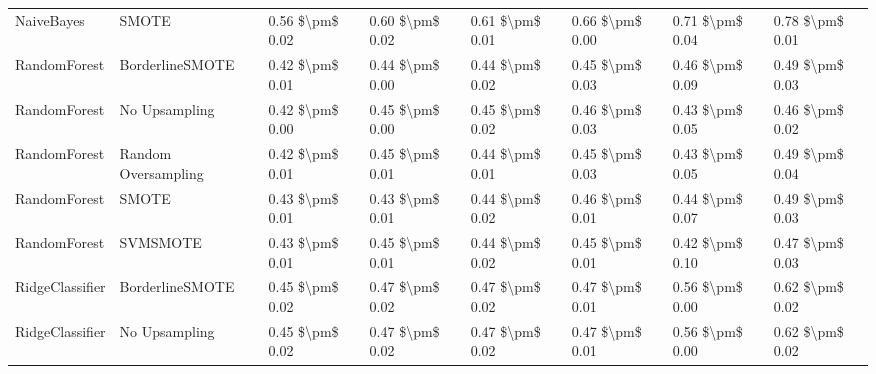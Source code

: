 \begin{tabular}{llllllll}
                     NaiveBayes &                         SMOTE & 0.56 \$\textbackslash pm\$ 0.02 &           0.60 \$\textbackslash pm\$ 0.02 &       0.61 \$\textbackslash pm\$ 0.01 &        0.66 \$\textbackslash pm\$ 0.00 &                         0.71 \$\textbackslash pm\$ 0.04 &     0.78 \$\textbackslash pm\$ 0.01 \\
                   RandomForest &               BorderlineSMOTE & 0.42 \$\textbackslash pm\$ 0.01 &           0.44 \$\textbackslash pm\$ 0.00 &       0.44 \$\textbackslash pm\$ 0.02 &        0.45 \$\textbackslash pm\$ 0.03 &                         0.46 \$\textbackslash pm\$ 0.09 &     0.49 \$\textbackslash pm\$ 0.03 \\
                   RandomForest &                 No Upsampling & 0.42 \$\textbackslash pm\$ 0.00 &           0.45 \$\textbackslash pm\$ 0.00 &       0.45 \$\textbackslash pm\$ 0.02 &        0.46 \$\textbackslash pm\$ 0.03 &                         0.43 \$\textbackslash pm\$ 0.05 &     0.46 \$\textbackslash pm\$ 0.02 \\
                   RandomForest &           Random Oversampling & 0.42 \$\textbackslash pm\$ 0.01 &           0.45 \$\textbackslash pm\$ 0.01 &       0.44 \$\textbackslash pm\$ 0.01 &        0.45 \$\textbackslash pm\$ 0.03 &                         0.43 \$\textbackslash pm\$ 0.05 &     0.49 \$\textbackslash pm\$ 0.04 \\
                   RandomForest &                         SMOTE & 0.43 \$\textbackslash pm\$ 0.01 &           0.43 \$\textbackslash pm\$ 0.01 &       0.44 \$\textbackslash pm\$ 0.02 &        0.46 \$\textbackslash pm\$ 0.01 &                         0.44 \$\textbackslash pm\$ 0.07 &     0.49 \$\textbackslash pm\$ 0.03 \\
                   RandomForest &                      SVMSMOTE & 0.43 \$\textbackslash pm\$ 0.01 &           0.45 \$\textbackslash pm\$ 0.01 &       0.44 \$\textbackslash pm\$ 0.02 &        0.45 \$\textbackslash pm\$ 0.01 &                         0.42 \$\textbackslash pm\$ 0.10 &     0.47 \$\textbackslash pm\$ 0.03 \\
                RidgeClassifier &               BorderlineSMOTE & 0.45 \$\textbackslash pm\$ 0.02 &           0.47 \$\textbackslash pm\$ 0.02 &       0.47 \$\textbackslash pm\$ 0.02 &        0.47 \$\textbackslash pm\$ 0.01 &                         0.56 \$\textbackslash pm\$ 0.00 &     0.62 \$\textbackslash pm\$ 0.02 \\
                RidgeClassifier &                 No Upsampling & 0.45 \$\textbackslash pm\$ 0.02 &           0.47 \$\textbackslash pm\$ 0.02 &       0.47 \$\textbackslash pm\$ 0.02 &        0.47 \$\textbackslash pm\$ 0.01 &                         0.56 \$\textbackslash pm\$ 0.00 &     0.62 \$\textbackslash pm\$ 0.02 \\

\end{tabular}
